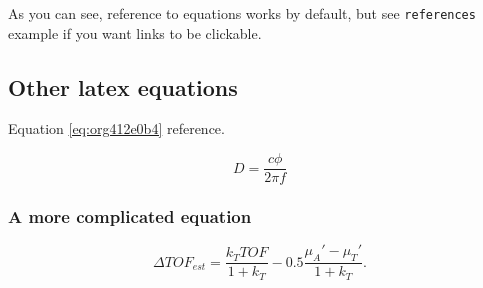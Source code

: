 As you can see, reference to equations works by default, but see \texttt{references}
example if you want links to be clickable.

\subsection{Other latex equations}
\label{sec:org07a8827}
Equation \ref{eq:org412e0b4} reference.

\begin{equation}
\label{eq:org412e0b4}
D = \frac{c\phi}{2\pi f}
\end{equation}

\subsubsection{A more complicated equation}
\label{sec:orga82ef22}

\begin{equation}
\Delta TOF_{est} = \frac{k_T TOF}{1+k_T } - 0.5 \frac{\mu_A' - \mu_T'}{1+k_T}.
\end{equation}


